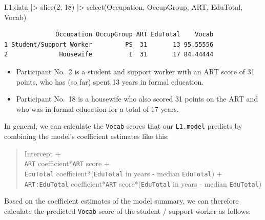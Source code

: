 \documentclass[
  letterpaper,
  DIV=11,
  numbers=noendperiod]{scrreprt}
\newenvironment{Shaded}{\begin{snugshade}}{\end{snugshade}}
\newcommand{\DecValTok}[1]{\textcolor[rgb]{0.68,0.00,0.00}{#1}}
\newcommand{\FunctionTok}[1]{\textcolor[rgb]{0.28,0.35,0.67}{#1}}
\newcommand{\NormalTok}[1]{\textcolor[rgb]{0.00,0.23,0.31}{#1}}
\newcommand{\SpecialCharTok}[1]{\textcolor[rgb]{0.37,0.37,0.37}{#1}}
\begin{document}
\begin{Shaded}
\begin{Highlighting}[]
\NormalTok{L1.data }\SpecialCharTok{|\textgreater{}} 
  \FunctionTok{slice}\NormalTok{(}\DecValTok{2}\NormalTok{, }\DecValTok{18}\NormalTok{) }\SpecialCharTok{|\textgreater{}} 
  \FunctionTok{select}\NormalTok{(Occupation, OccupGroup, ART, EduTotal, Vocab)}
\end{Highlighting}
\end{Shaded}

\begin{verbatim}
              Occupation OccupGroup ART EduTotal    Vocab
1 Student/Support Worker         PS  31       13 95.55556
2              Housewife          I  31       17 84.44444
\end{verbatim}

\begin{itemize}
\item
  Participant No.~2 is a student and support worker with an ART score of
  31 points, who has (so far) spent 13 years in formal education.
\item
  Participant No.~18 is a housewife who also scored 31 points on the ART
  and who was in formal education for a total of 17 years.
\end{itemize}

In general, we can calculate the \texttt{Vocab} scores that our
\texttt{L1.model} predicts by combining the model's coefficient
estimates like this:

\begin{quote}
Intercept +\\
\texttt{ART} coefficient*\texttt{ART} score +\\
\texttt{EduTotal} coefficient*(\texttt{EduTotal} in years - median
\texttt{EduTotal}) +\\
\texttt{ART:EduTotal} coefficient*\texttt{ART} score*(\texttt{EduTotal}
in years - median \texttt{EduTotal})
\end{quote}

Based on the coefficient estimates of the model summary, we can
therefore calculate the predicted \texttt{Vocab} score of the student /
support worker as follows:
\end{document}
